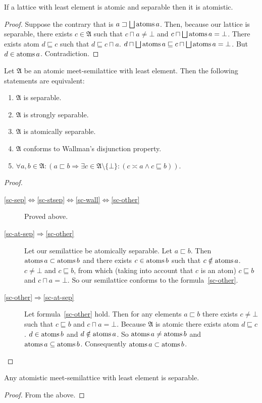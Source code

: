 \begin{thm}
\label{atomistic-enough}If a lattice with least element is atomic
and separable then it is atomistic.\end{thm}
\begin{proof}
Suppose the contrary that is $a\sqsupset\bigsqcup\atoms a$. Then,
because our lattice is separable, there exists $c\in\mathfrak{A}$
such that $c\sqcap a\neq\bot$ and $c\sqcap\bigsqcup\atoms a=\bot$.
There exists atom $d\sqsubseteq c$ such that $d\sqsubseteq c\sqcap a$.
$d\sqcap\bigsqcup\atoms a\sqsubseteq c\sqcap\bigsqcup\atoms a=\bot$.
But $d\in\operatorname{atoms} a$. Contradiction.\end{proof}
\begin{thm}
\label{sep-conds}Let $\mathfrak{A}$ be an atomic meet-semilattice
with least element. Then the following statements are equivalent:
\begin{enumerate}
\item \label{sc-sep}$\mathfrak{A}$ is separable.
\item \label{sc-stsep}$\mathfrak{A}$ is strongly separable.
\item \label{sc-at-sep}$\mathfrak{A}$ is atomically separable.
\item \label{sc-wall}$\mathfrak{A}$ conforms to Wallman's disjunction
property.
\item \label{sc-other}$\forall a,b\in\mathfrak{A}:(a\sqsubset b\Rightarrow\exists c\in\mathfrak{A}\setminus\{\bot\}:(c\asymp a\land c\sqsubseteq b))$.
\end{enumerate}
\end{thm}
\begin{proof}
~
\begin{description}
\item [{\ref{sc-sep}$\Leftrightarrow$\ref{sc-stsep}$\Leftrightarrow$\ref{sc-wall}$\Leftrightarrow$\ref{sc-other}}] Proved
above.
\item [{\ref{sc-at-sep}$\Rightarrow$\ref{sc-other}}] Let our semilattice
be atomically separable. Let $a\sqsubset b$. Then $\operatorname{atoms} a\subset\operatorname{atoms} b$
and there exists $c\in\operatorname{atoms} b$ such that $c\notin\operatorname{atoms} a$. $c\neq\bot$
and $c\sqsubseteq b$, from which (taking into account that $c$ is
an atom) $c\sqsubseteq b$ and $c\sqcap a=\bot$. So our semilattice
conforms to the formula~\ref{sc-other}.
\item [{\ref{sc-other}$\Rightarrow$\ref{sc-at-sep}}] Let formula~\ref{sc-other}
hold. Then for any elements $a\sqsubset b$ there exists $c\neq\bot$
such that $c\sqsubseteq b$ and $c\sqcap a=\bot$. Because $\mathfrak{A}$
is atomic there exists atom $d\sqsubseteq c$. $d\in\operatorname{atoms} b$ and
$d\notin\operatorname{atoms} a$. So $\operatorname{atoms} a\neq\operatorname{atoms} b$ and $\operatorname{atoms} a\subseteq\operatorname{atoms} b$.
Consequently $\operatorname{atoms} a\subset\operatorname{atoms} b$.
\end{description}
\end{proof}
\begin{thm}
\label{atom-is-sep}Any atomistic meet-semilattice with least element
is separable.\end{thm}
\begin{proof}
From the above.
\end{proof}

